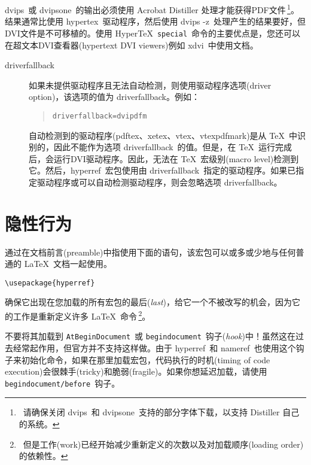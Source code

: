 \documentclass{article}
\newcommand*{\xpackage}[1]{\textsf{#1}}
\newcommand{\bs}{\symbol{'134}}%
\newcommand{\ci}[1]{\texttt{\bs#1}}
\begin{document}
\textsf{dvips}\ 或 \textsf{dvipsone}\ 的输出必须使用 Acrobat Distiller 处理才能获得PDF文件\,\footnote{\ 请确保关闭 \textsf{dvips}\ 和 \textsf{dvipsone}\ 支持的部分字体下载，以支持 Distiller 自己的系统。}。结果通常比使用 \textsf{hypertex}\ 驱动程序，然后使用 \textsf{dvips -z}\ 处理产生的结果要好，但DVI文件是不可移植的。使用 Hyper\TeX\ \ci{special}\ 命令的主要优点是，您还可以在超文本DVI查看器(hypertext DVI viewers)例如 \textsf{xdvi}\ 中使用文档。

\begin{description}
  \item[driverfallback]
        如果未提供驱动程序且无法自动检测，则使用驱动程序选项(driver option)，该选项的值为 \textsf{driverfallback}。例如：
        \begin{quote}
          \texttt{driverfallback=dvipdfm}
        \end{quote}
        自动检测到的驱动程序(\textsf{pdftex}、\textsf{xetex}、\textsf{vtex}、\textsf{vtexpdfmark})是从 \TeX\ 中识别的，因此不能作为选项 \textsf{driverfallback}\ 的值。但是，在 \TeX\ 运行完成后，会运行DVI驱动程序。因此，无法在 \TeX\ 宏级别(macro level)检测到它。然后，\xpackage{hyperref}\ 宏包使用由 \textsf{driverfallback}\ 指定的驱动程序。如果已指定驱动程序或可以自动检测驱动程序，则会忽略选项 \textsf{driverfallback}。
\end{description}

\newpage
\section{\heiti 隐性行为}

通过在文档前言(preamble)中指使用下面的语句，该宏包可以或多或少地与任何普通的 \LaTeX\ 文档一起使用。
{\large \color{blue}
\begin{verbatim}
\usepackage{hyperref}
\end{verbatim} }

确保它出现在您加载的所有宏包的{\kaiti 最后}(\emph{last})，给它一个不被改写的机会，因为它的工作是重新定义许多 \LaTeX\ 命令\,\footnote{\ 但是工作(work)已经开始减少重新定义的次数以及对加载顺序(loading order)的依赖性。}。

{\kaiti 不要将其加载到} \ci{AtBeginDocument}\ {\kaiti 或} \texttt{begindocument}\ {\kaiti 钩子}(\emph{hook}){\kaiti 中！}虽然这在过去经常起作用，但官方并不支持这样做。由于 \xpackage{hyperref}\ 和 \xpackage{nameref}\ 也使用这个钩子来初始化命令，如果在那里加载宏包，代码执行的时机(timing of code execution)会很棘手(tricky)和脆弱(fragile)。如果你想延迟加载，请使用 \texttt{begindocument/before}\ 钩子。
\end{document}
